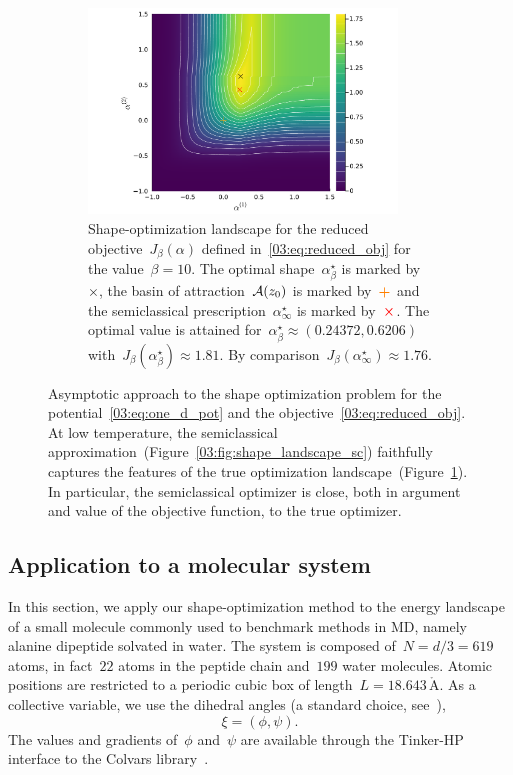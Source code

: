 \begin{figure}
\begin{subfigure}{0.9\textwidth}
        \includegraphics[width=0.9\textwidth]{figures/03/semiclassic/J_red_10.pdf}
            \caption[]{Shape-optimization landscape for the reduced objective~$J_\beta(\alpha)$ defined in~\eqref{03:eq:reduced_obj} for the value~$\beta=10$. The optimal shape~$\alpha^\star_\beta$ is marked by~$\boldsymbol{\times}$, the basin of attraction~$\mathcal{A}(z_0)$ is marked by~$\boldsymbol{\color{orange}{+}}$ and the semiclassical prescription~$\alpha^\star_\infty$ is marked by~$\boldsymbol{\color{red}{\times}}$. The optimal value is attained for~$\alpha^\star_{\beta}\approx(0.24372,0.6206)$ with~$J_{\beta}(\alpha^\star_{\beta})\approx 1.81$. By comparison~$J_\beta(\alpha^\star_\infty)\approx 1.76$.}
            \label{03:fig:shape_landscape_10}
        \end{subfigure}
        \caption[]{Asymptotic approach to the shape optimization problem for the potential~\eqref{03:eq:one_d_pot} and the objective~\eqref{03:eq:reduced_obj}. At low temperature, the semiclassical approximation~(Figure~\ref{03:fig:shape_landscape_sc}) faithfully captures the features of the true optimization landscape~(Figure~\ref{03:fig:shape_landscape_10}). In particular, the semiclassical optimizer is close, both in argument and value of the objective function, to the true optimizer.}
    \label{03:fig:opt_1D}
\end{figure}

\subsection{Application to a molecular system}
\label{03:subsec:diala}
In this section, we apply our shape-optimization method to the energy landscape of a small molecule commonly used to benchmark methods in MD, namely alanine dipeptide solvated in water. The system is composed of~$N=d/3=619$ atoms, in fact~$22$ atoms in the peptide chain and~$199$ water molecules. Atomic positions are restricted to a periodic cubic box of length~$L= 18.643\,\mathring{\mathrm{A}}$. As a collective variable, we use the dihedral angles (a standard choice, see~\cite{BDC00}),
$$\xi=(\phi,\psi).$$
The values and gradients of~$\phi$ and~$\psi$ are available through the Tinker-HP~\cite{Tinker18} interface to the Colvars library~\cite{FKH13}.

